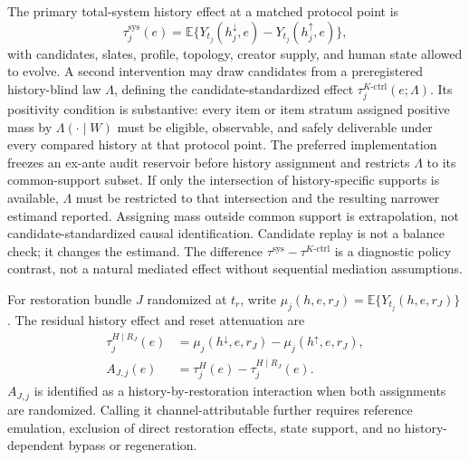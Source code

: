 \documentclass[10pt,a4paper]{article}
\newcommand{\E}{\mathbb{E}}
\begin{document}
The primary total-system history effect at a matched protocol point is
\begin{equation}
\tau_j^{\mathrm{sys}}(e)=
\E\{Y_{t_j}(h_j^\downarrow,e)-Y_{t_j}(h_j^\uparrow,e)\},
\label{eq:total-system-effect}
\end{equation}
with candidates, slates, profile, topology, creator supply, and human state allowed to evolve. A second intervention may draw candidates from a preregistered history-blind law $\Lambda$, defining the candidate-standardized effect $\tau_j^{K\text{-}\mathrm{ctrl}}(e;\Lambda)$. Its positivity condition is substantive: every item or item stratum assigned positive mass by $\Lambda(\cdot\mid W)$ must be eligible, observable, and safely deliverable under every compared history at that protocol point. The preferred implementation freezes an ex-ante audit reservoir before history assignment and restricts $\Lambda$ to its common-support subset. If only the intersection of history-specific supports is available, $\Lambda$ must be restricted to that intersection and the resulting narrower estimand reported. Assigning mass outside common support is extrapolation, not candidate-standardized causal identification. Candidate replay is not a balance check; it changes the estimand. The difference $\tau^{\mathrm{sys}}-\tau^{K\text{-}\mathrm{ctrl}}$ is a diagnostic policy contrast, not a natural mediated effect without sequential mediation assumptions.

For restoration bundle $J$ randomized at $t_r$, write $\mu_j(h,e,r_J)=\E\{Y_{t_j}(h,e,r_J)\}$. The residual history effect and reset attenuation are
\begin{align}
\tau_j^{H\mid R_J}(e)&=\mu_j(h^\downarrow,e,r_J)-\mu_j(h^\uparrow,e,r_J),\\
A_{J,j}(e)&=\tau_j^H(e)-\tau_j^{H\mid R_J}(e).
\label{eq:reset-attenuation}
\end{align}
$A_{J,j}$ is identified as a history-by-restoration interaction when both assignments are randomized. Calling it channel-attributable further requires reference emulation, exclusion of direct restoration effects, state support, and no history-dependent bypass or regeneration.
\end{document}
